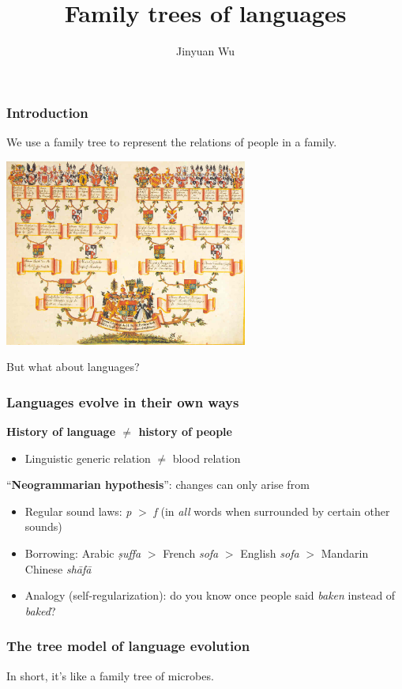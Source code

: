 \documentclass{beamer}
\title{Family trees of languages}
\author{Jinyuan Wu}
\newcommand{\corpus}[1]{\textit{#1}}
\begin{document}
\frame{\titlepage}

\begin{frame}
\frametitle{Introduction}

We use a family tree to represent the relations of people in a family.

\begin{center}
    \includegraphics[width=0.6\textwidth]{photos/Waldburg-Ahnentafel.jpg}
\end{center} 

But what about languages?

\end{frame}

\begin{frame}
\frametitle{Languages evolve in their own ways}

\textbf{History of language $\neq$ history of people} 

\begin{itemize}
    \item Linguistic generic relation $\neq$ blood relation
\end{itemize}

``\textbf{Neogrammarian hypothesis}'':
changes can only arise from
\begin{itemize}
    \item Regular sound laws: \corpus{p} $>$ \corpus{f} 
    (in \emph{all} words when surrounded by certain other sounds)
    \item Borrowing: Arabic \corpus{ṣuffa} $>$ French \corpus{sofa} $>$ English \corpus{sofa} $>$ Mandarin Chinese \corpus{sh\={a}f\={a}} 
    \item Analogy (self-regularization): do you know once people said \corpus{baken} instead of \corpus{baked}?
\end{itemize}    

\end{frame}

\begin{frame}
\frametitle{The tree model of language evolution}

\begin{center}
    
\end{center} 

In short, it's like a family tree of microbes.

\end{frame}
\end{document}

